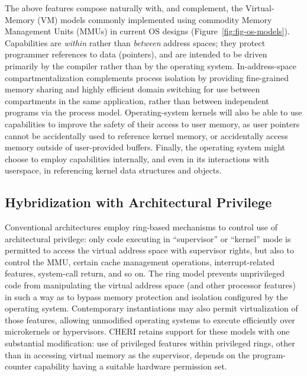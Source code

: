 The above features compose naturally with, and complement, the Virtual-Memory (VM)
models commonly implemented using commodity Memory Management Units (MMUs) in
current OS designs (Figure~\ref{fig:fig-os-models}).
Capabilities are \textit{within} rather than \textit{between} address spaces;
they protect programmer references to data (pointers), and are intended to be
driven primarily by the compiler rather than by the operating system.
In-address-space compartmentalization complements process isolation by
providing fine-grained memory sharing and highly efficient domain switching
for use between compartments in the same application, rather than between
independent programs via the process model.
Operating-system kernels will also be able to use capabilities to improve the
safety of their access to user memory, as user pointers cannot be accidentally
used to reference kernel memory, or accidentally access memory outside of
user-provided buffers.
Finally, the operating system might choose to employ capabilities internally,
and even in its interactions with userspace, in referencing kernel data
structures and objects.

\subsection{Hybridization with Architectural Privilege}
\label{sec:model-hybridization-architectural-privilege}

Conventional architectures employ ring-based mechanisms to control use of
architectural privilege: only code executing in ``supervisor'' or ``kernel''
mode is permitted to access the virtual address space with supervisor rights,
but also to control the MMU, certain cache management operations,
interrupt-related features, system-call return, and so on.
The ring model prevents unprivileged code from manipulating the virtual
address space (and other processor features) in such a way as to bypass memory
protection and isolation configured by the operating system.
Contemporary instantiations may also permit virtualization of those features,
allowing unmodified operating systems to execute efficiently over microkernels
or hypervisors.
CHERI retains support for these models with one substantial modification: use
of privileged features within privileged rings, other than in accessing
virtual memory as the supervisor, depends on the program-counter capability
having a suitable hardware permission set.

